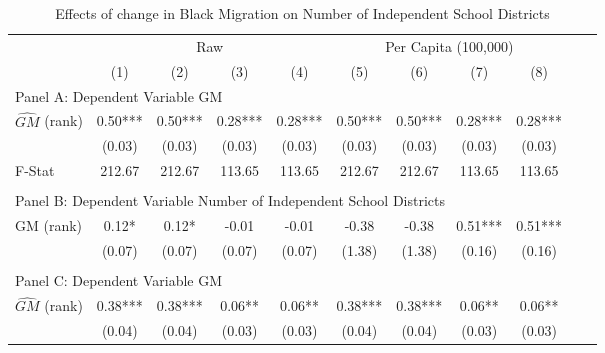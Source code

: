  \begin{table}[htbp]\centering {} \begin{threeparttable} \caption{Effects of change in Black Migration on Number of Independent School Districts} \begin{tabular}{l*{10}{c}} \toprule
                &\multicolumn{4}{c}{Raw}                                    &\multicolumn{4}{c}{Per Capita (100,000)}                   \\\cmidrule(lr){2-5}\cmidrule(lr){6-9}
                &\multicolumn{1}{c}{(1)}   &\multicolumn{1}{c}{(2)}   &\multicolumn{1}{c}{(3)}   &\multicolumn{1}{c}{(4)}   &\multicolumn{1}{c}{(5)}   &\multicolumn{1}{c}{(6)}   &\multicolumn{1}{c}{(7)}   &\multicolumn{1}{c}{(8)}   \\
\cmidrule(lr){1-9}
\multicolumn{8}{l}{Panel A: Dependent Variable GM}\\
\cmidrule(lr){1-9}
$\hat{GM}$ (rank)&       0.50***&       0.50***&       0.28***&       0.28***&       0.50***&       0.50***&       0.28***&       0.28***\\
                &     (0.03)   &     (0.03)   &     (0.03)   &     (0.03)   &     (0.03)   &     (0.03)   &     (0.03)   &     (0.03)   \\
\midrule
F-Stat          &     212.67   &     212.67   &     113.65   &     113.65   &     212.67   &     212.67   &     113.65   &     113.65   \\
\cmidrule[\heavyrulewidth](lr){1-9} \\ \cmidrule[\heavyrulewidth](lr){1-9}
\multicolumn{8}{l}{Panel B: Dependent Variable Number of Independent School Districts}\\
\cmidrule(lr){1-9}
GM  (rank)      &       0.12*  &       0.12*  &      -0.01   &      -0.01   &      -0.38   &      -0.38   &       0.51***&       0.51***\\
                &     (0.07)   &     (0.07)   &     (0.07)   &     (0.07)   &     (1.38)   &     (1.38)   &     (0.16)   &     (0.16)   \\
\cmidrule[\heavyrulewidth](lr){1-9} \\ \cmidrule[\heavyrulewidth](lr){1-9}
\multicolumn{8}{l}{Panel C: Dependent Variable GM}\\
\cmidrule(lr){1-9}
$\hat{GM}$ (rank)&       0.38***&       0.38***&       0.06** &       0.06** &       0.38***&       0.38***&       0.06** &       0.06** \\
                &     (0.04)   &     (0.04)   &     (0.03)   &     (0.03)   &     (0.04)   &     (0.04)   &     (0.03)   &     (0.03)   \\

\end{tabular}
\end{threeparttable}
\end{table}
